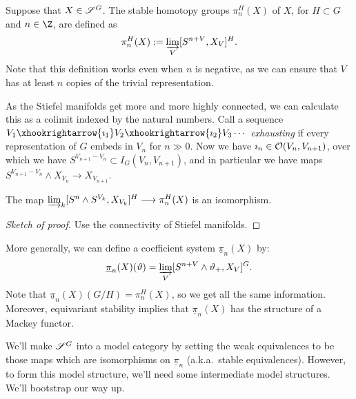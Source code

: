 \documentclass[11pt]{article}
\begin{document}
\begin{FifthWeek}
Suppose that $X\in\scrS^G$. The stable homotopy groups $\pi_n^H(X)$ of $X$, for $H\subset G$ and $n\in\Z$, are defined as
\[\pi_n^H(X):=\varinjlim_{V}[S^{n+V},X_V]^H.\]
Note that this definition works even when $n$ is negative, as we can ensure that $V$ has at least $n$ copies of the trivial representation.
\begin{rmk*}
As the Stiefel manifolds get more and more highly connected, we can calculate this as a colimit indexed by the natural numbers. Call a sequence $V_1\xhookrightarrow{\imath_1}V_2\xhookrightarrow{\imath_2}V_3\cdots$ \emph{exhausting} if every representation of $G$ embeds in $V_n$ for $n\gg0$. Now we have $\imath_n\in\calO(V_n,V_{n+1})$, over which we have $S^{V_{n+1}-V_n}\subset I_G(V_n,V_{n+1})$, and in particular we have maps $S^{V_{n+1}-V_n}\wedge X_{V_n}\to X_{V_{n+1}}$.
\begin{prop*}
The map $\varinjlim_k[S^n\wedge S^{V_k},X_{V_k}]^H\to \pi_n^H(X)$ is an isomorphism.
\end{prop*}
\begin{proof}[Sketch of proof]
Use the connectivity of Stiefel manifolds. 
\end{proof}
\end{rmk*}
More generally, we can define a coefficient system $\underline \pi_n(X)$ by:
\[\underline\pi_n(X)(\vartheta)=\varinjlim_V[S^{n+V}\wedge \vartheta_+,X_V]^G.\]
Note that $\underline\pi_n(X)(G/H)=\pi_n^H(X)$, so we get all the same information. Moreover, equivariant stability implies that $\underline\pi_n(X)$ has the structure of a Mackey functor. 

We'll make $\scrS^G$ into a model category by setting the weak equivalences to be those maps which are isomorphisms on $\underline\pi_n$ (a.k.a.\ stable equivalences). However, to form this model structure, we'll need some intermediate model structures. We'll bootstrap our way up.


\end{FifthWeek}
\end{document}
